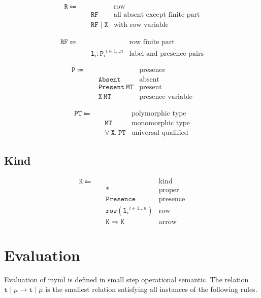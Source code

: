 \documentclass{report}
\newcommand{\theLang}{myml}
\newcommand{\code}{\mathtt}
\begin{document}
\begin{align*}
\code{R} \Coloneqq \quad & & \text{row} \\
& \code{RF} & \text{all absent except finite part} \\
& \code{RF \mid X} & \text{with row variable}
\end{align*}

\begin{align*}
\code{RF} \Coloneqq \quad & & \text{row finite part} \\
& {\code{l}_i : \code{P}_i}^{i \in 1\dots n} & \text{label and presence pairs}
\end{align*}

\begin{align*}
\code{P} \Coloneqq \quad & & \text{presence} \\
& \code{Absent} & \text{absent} \\
& \code{Present\ MT} & \text{present} \\
& \code{X\ MT} & \text{presence variable}
\end{align*}

\begin{align*}
\code{PT} \Coloneqq\quad & & \text{polymorphic type} \\
& \code{MT} & \text{monomorphic type} \\
& \code{\forall\ X.\ PT} & \text{universal qualified}
\end{align*}

\subsection{Kind}

\begin{align*}
\code{K} \Coloneqq \quad & & \text{kind} \\
& \code{*} & \text{proper} \\
& \code{Presence} & \text{presence} \\
& \code{row}({\code{l}_i}^{i \in 1\dots n}) & \text{row} \\
& \code{K \Rightarrow K} & \text{arrow}
\end{align*}

\section{Evaluation}

Evaluation of \theLang{} is defined in small step operational semantic. The relation \(\code{t}\mid\mu \longrightarrow \code{t}\mid\mu\) is the smallest relation satisfying all instances of the following rules.
\end{document}
